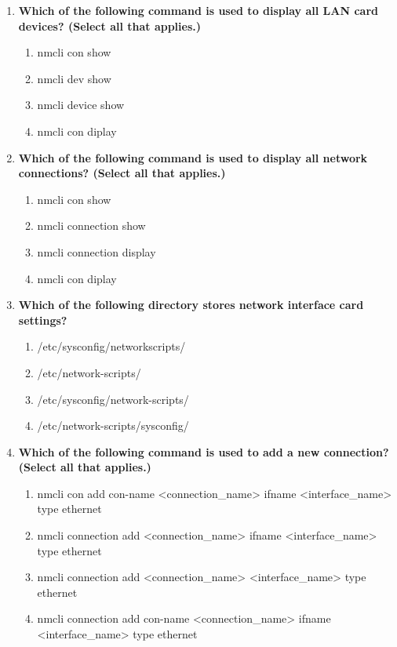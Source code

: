 \begin{flushleft}
\begin{enumerate}
		\item \textbf{Which of the following command is used to display all LAN card devices? (Select all that applies.)}
		\begin{enumerate}[label=(\alph*)]
			\item nmcli con show
			\item nmcli dev show %
			\item nmcli device show %
			\item nmcli con diplay
		\end{enumerate}
		\bigskip
		\bigskip		
		
		\item \textbf{Which of the following command is used to display all network connections? (Select all that applies.)}
		\begin{enumerate}[label=(\alph*)]
			\item nmcli con show  %
			\item nmcli connection show %
			\item nmcli connection display %
			\item nmcli con diplay
		\end{enumerate}
		\bigskip
		\bigskip		

		\item \textbf{Which of the following directory stores network interface card settings?}
		\begin{enumerate}[label=(\alph*)]
			\item /etc/sysconfig/networkscripts/
			\item /etc/network-scripts/
			\item /etc/sysconfig/network-scripts/  %
			\item /etc/network-scripts/sysconfig/
		\end{enumerate}
		\bigskip
		\bigskip	

		\item \textbf{Which of the following command is used to add a new connection? (Select all that applies.)}
		\begin{enumerate}[label=(\alph*)]
			\item nmcli con add con-name <connection\_name> ifname <interface\_name> type ethernet  %
			\item nmcli connection add <connection\_name> ifname <interface\_name> type ethernet    
			\item nmcli connection add <connection\_name> <interface\_name> type ethernet  
			\item nmcli connection add con-name <connection\_name> ifname <interface\_name> type ethernet    %
		\end{enumerate}
		\bigskip
		\bigskip	
		

\end{enumerate}
\end{flushleft}
